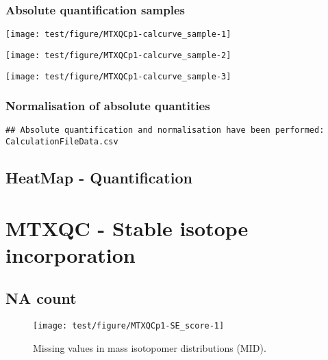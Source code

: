 \documentclass[9pt,]{article}
\begin{document}
\subsubsection{Absolute quantification
samples}\label{absolute-quantification-samples}

\begin{center}\texttt{[image: test/figure/MTXQCp1-calcurve\_sample-1]} \end{center}

\begin{center}\texttt{[image: test/figure/MTXQCp1-calcurve\_sample-2]} \end{center}

\begin{center}\texttt{[image: test/figure/MTXQCp1-calcurve\_sample-3]} \end{center}

\subsubsection{Normalisation of absolute
quantities}\label{normalisation-of-absolute-quantities}

\begin{verbatim}
## Absolute quantification and normalisation have been performed: CalculationFileData.csv
\end{verbatim}

\subsection{HeatMap - Quantification}\label{heatmap---quantification}

\clearpage

\section{MTXQC - Stable isotope
incorporation}\label{mtxqc---stable-isotope-incorporation}

\subsection{NA count}\label{na-count}

\begin{figure}

{\centering \texttt{[image: test/figure/MTXQCp1-SE\_score-1]} 

}

\caption{Missing values in mass isotopomer distributions (MID).}\label{fig:SE_score}
\end{figure}
\end{document}
